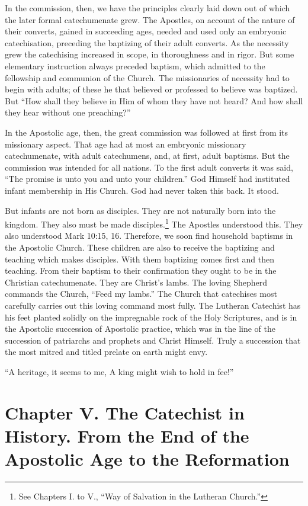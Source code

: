 In the commission, then, we have the principles clearly laid down out of which the later formal catechumenate grew. The Apostles, on account of
 the nature of their converts, gained in succeeding ages, needed and used only an embryonic catechisation, preceding the baptizing of their adult converts. As the necessity grew the catechising increased in scope, in thoroughness and in rigor. But some elementary instruction always preceded baptism, which admitted to the fellowship and communion of the Church. The missionaries of necessity had to begin with adults; of these he that believed or professed to believe was baptized. But “How shall they believe in Him of whom they have not heard? And how shall they hear without one preaching?”

In the Apostolic age, then, the great commission was followed at first from its missionary aspect. That age had at most an embryonic missionary catechumenate, with adult catechumens, and, at first, adult baptisms. But the commission was intended for all nations. To the first adult converts it was said, “The promise is unto you and unto your children.” God Himself had instituted infant membership in His Church. God had never taken this back. It stood.

But infants are not born as disciples. They are not naturally born into the kingdom. They also must be made disciples.\footnote{See Chapters I. to V., “Way of Salvation in the Lutheran Church.”}
 The Apostles understood this. They also understood Mark 10:15, 16. Therefore, we soon find household baptisms in the Apostolic Church. These children are also to receive the baptizing and teaching which makes disciples. With them baptizing comes first and then teaching. From their baptism to their confirmation they ought to be in the Christian catechumenate. They are Christ’s lambs. The loving Shepherd commands the Church, “Feed my lambs.” The Church that catechises most carefully carries out this loving command most fully. The Lutheran Catechist has his feet planted solidly on the impregnable rock of the Holy Scriptures, and is in the Apostolic succession of Apostolic practice, which was in the line of the succession of patriarchs and prophets and Christ Himself. Truly a succession that the most mitred and titled prelate on earth might envy.


“A heritage, it seems to me,
A king might wish to hold in fee!”

\chapter[Chapter V. The Catechist in History]{Chapter V. The Catechist in History. From the End of the Apostolic Age to the Reformation}

